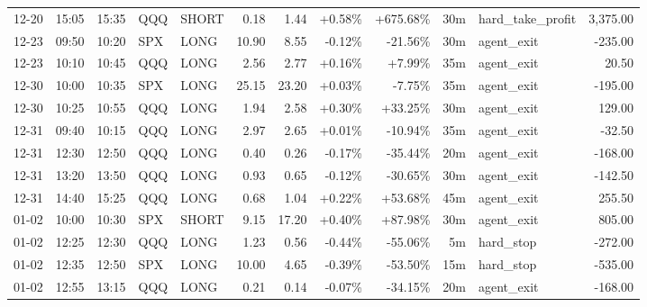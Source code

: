 \documentclass[11pt,a4paper,twoside]{article}
\begin{document}
\begin{center}
\begin{longtable}{>{\color{txtmain}}l l l l l r r r r r >{\color{txtmain}}l r}
12-20 & 15:05 & 15:35 & QQQ & SHORT & 0.18 & 1.44 & \textcolor{wingreen}{+0.58\%} & \textcolor{wingreen}{+675.68\%} & 30m & hard\_take\_profit & \textcolor{wingreen}{3,375.00} \\
12-23 & 09:50 & 10:20 & SPX & LONG & 10.90 & 8.55 & \textcolor{lossred}{-0.12\%} & \textcolor{lossred}{-21.56\%} & 30m & agent\_exit & \textcolor{lossred}{-235.00} \\
12-23 & 10:10 & 10:45 & QQQ & LONG & 2.56 & 2.77 & \textcolor{wingreen}{+0.16\%} & \textcolor{wingreen}{+7.99\%} & 35m & agent\_exit & \textcolor{wingreen}{20.50} \\
12-30 & 10:00 & 10:35 & SPX & LONG & 25.15 & 23.20 & \textcolor{wingreen}{+0.03\%} & \textcolor{lossred}{-7.75\%} & 35m & agent\_exit & \textcolor{lossred}{-195.00} \\
12-30 & 10:25 & 10:55 & QQQ & LONG & 1.94 & 2.58 & \textcolor{wingreen}{+0.30\%} & \textcolor{wingreen}{+33.25\%} & 30m & agent\_exit & \textcolor{wingreen}{129.00} \\
12-31 & 09:40 & 10:15 & QQQ & LONG & 2.97 & 2.65 & \textcolor{wingreen}{+0.01\%} & \textcolor{lossred}{-10.94\%} & 35m & agent\_exit & \textcolor{lossred}{-32.50} \\
12-31 & 12:30 & 12:50 & QQQ & LONG & 0.40 & 0.26 & \textcolor{lossred}{-0.17\%} & \textcolor{lossred}{-35.44\%} & 20m & agent\_exit & \textcolor{lossred}{-168.00} \\
12-31 & 13:20 & 13:50 & QQQ & LONG & 0.93 & 0.65 & \textcolor{lossred}{-0.12\%} & \textcolor{lossred}{-30.65\%} & 30m & agent\_exit & \textcolor{lossred}{-142.50} \\
12-31 & 14:40 & 15:25 & QQQ & LONG & 0.68 & 1.04 & \textcolor{wingreen}{+0.22\%} & \textcolor{wingreen}{+53.68\%} & 45m & agent\_exit & \textcolor{wingreen}{255.50} \\
01-02 & 10:00 & 10:30 & SPX & SHORT & 9.15 & 17.20 & \textcolor{wingreen}{+0.40\%} & \textcolor{wingreen}{+87.98\%} & 30m & agent\_exit & \textcolor{wingreen}{805.00} \\
01-02 & 12:25 & 12:30 & QQQ & LONG & 1.23 & 0.56 & \textcolor{lossred}{-0.44\%} & \textcolor{lossred}{-55.06\%} & 5m & hard\_stop & \textcolor{lossred}{-272.00} \\
01-02 & 12:35 & 12:50 & SPX & LONG & 10.00 & 4.65 & \textcolor{lossred}{-0.39\%} & \textcolor{lossred}{-53.50\%} & 15m & hard\_stop & \textcolor{lossred}{-535.00} \\
01-02 & 12:55 & 13:15 & QQQ & LONG & 0.21 & 0.14 & \textcolor{lossred}{-0.07\%} & \textcolor{lossred}{-34.15\%} & 20m & agent\_exit & \textcolor{lossred}{-168.00} \\

\end{longtable}
\end{center}
\end{document}
